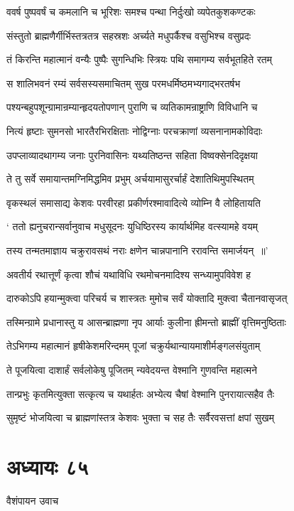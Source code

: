 \twolineshloka
{ववर्ष पुष्पवर्षं च कमलानि च भूरिशः}
{समश्च पन्था निर्दुःखो व्यपेतकुशकण्टकः}


\twolineshloka
{संस्तुतो ब्राह्मणैर्गीर्भिस्तत्रतत्र सहस्रशः}
{अर्च्यते मधुपर्कैश्च वसुभिश्च वसुप्रदः}


\twolineshloka
{तं किरन्ति महात्मानं वन्यैः पुष्पैः सुगन्धिभिः}
{स्त्रियः पथि समागम्य सर्वभूतहिते रतम्}


\twolineshloka
{स शालिभवनं रम्यं सर्वसस्यसमाचितम्}
{सुख परमधर्मिष्ठमभ्यगाद्भरतर्षभ}


\twolineshloka
{पश्यन्बहुपशून्ग्रामान्रम्यान्हृदयतोपणान्}
{पुराणि च व्यतिकामन्राष्ट्राणि विविधानि च}


\twolineshloka
{नित्यं हृष्टाः सुमनसो भारतैरभिरक्षिताः}
{नोद्विग्नाः परचक्राणां व्यसनानामकोविदाः}


\twolineshloka
{उपप्लाव्यादथागम्य जनाः पुरनिवासिनः}
{यथ्यतिष्ठन्त सहिता विष्वक्सेनदिदृक्षया}


\twolineshloka
{ते तु सर्वे समायान्तमग्निमिद्धमिव प्रभुम्}
{अर्चयामासुरर्चार्हं देशातिथिमुपस्थितम्}


\twolineshloka
{वृकस्थलं समासाद्य केशवः परवीरहा}
{प्रकीर्णरश्मावादित्ये व्योम्नि वै लोहितायति}


\twolineshloka
{` ततो ह्यनुचरान्सर्वानुवाच मधुसूदनः}
{युधिष्ठिरस्य कार्यार्थमिह वत्स्यामहे वयम्}


\twolineshloka
{तस्य तन्मतमाज्ञाय चक्रुरावसथं नराः}
{क्षणेन चान्नपानानि ररावन्ति समार्जयन् ॥'}


\twolineshloka
{अवतीर्य रथात्तूर्णं कृत्वा शौचं यथाविधि}
{रथमोचनमादिश्य सन्ध्यामुपविवेश ह}


\twolineshloka
{दारुकोऽपि हयान्मुक्त्वा परिचर्य च शास्त्रतः}
{मुमोच सर्वं योक्तादि मुक्त्वा चैतानवासृजत्}


\twolineshloka
{तस्मिन्ग्रामे प्रधानास्तु य आसन्ब्राह्मणा नृप}
{आर्याः कुलीना ह्रीमन्तो ब्राह्मीं वृत्तिमनुष्ठिताः}


\twolineshloka
{तेऽभिगम्य महात्मानं हृषीकेशमरिन्दमम्}
{पूजां चक्रुर्यथान्यायमाशीर्मङ्गलसंयुताम्}


\twolineshloka
{ते पूजयित्वा दाशार्हं सर्वलोकेषु पूजितम्}
{न्यवेदयन्त वेश्मानि गुणवन्ति महात्मने}


\twolineshloka
{तान्प्रभुः कृतमित्युक्ता सत्कृत्य च यथार्हतः}
{अभ्येत्य चैषां वेश्मानि पुनरायात्सहैव तैः}


\twolineshloka
{सुमृष्टं भोजयित्वा च ब्राह्मणांस्तत्र केशवः}
{भुक्ता च सह तैः सर्वैरवसत्तां क्षपां सुखम्}


\chapter{अध्यायः ८५}
\twolineshloka
{वैशंपायन उवाच}
{}


